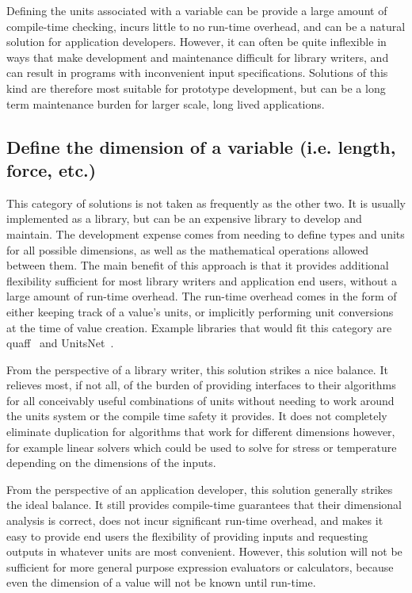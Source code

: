 \documentclass{article}
\begin{document}
Defining the units associated with a variable can be provide a large amount of compile-time checking,
incurs little to no run-time overhead, and can be a natural solution for application developers.
However, it can often be quite inflexible in ways that make development and maintenance difficult for library writers,
and can result in programs with inconvenient input specifications.
Solutions of this kind are therefore most suitable for prototype development,
but can be a long term maintenance burden for larger scale, long lived applications.

\subsection{Define the dimension of a variable (i.e. length, force, etc.)}
\label{static-dimensions}

This category of solutions is not taken as frequently as the other two.
It is usually implemented as a library, but can be an expensive library to develop and maintain.
The development expense comes from needing to define types and units for all possible dimensions,
as well as the mathematical operations allowed between them.
The main benefit of this approach is that it provides additional flexibility sufficient for most library writers
and application end users, without a large amount of run-time overhead.
The run-time overhead comes in the form of either keeping track of a value's units,
or implicitly performing unit conversions at the time of value creation.
Example libraries that would fit this category are quaff~\cite{QuaffFortranPackage} and UnitsNet~\cite{Larsen2021}.

From the perspective of a library writer, this solution strikes a nice balance.
It relieves most, if not all, of the burden of providing interfaces to their algorithms for all conceivably useful combinations of units without needing to work around the units system or the compile time safety it provides.
It does not completely eliminate duplication for algorithms that work for different dimensions however,
for example linear solvers which could be used to solve for stress or temperature depending on the dimensions of the inputs.

From the perspective of an application developer, this solution generally strikes the ideal balance.
It still provides compile-time guarantees that their dimensional analysis is correct,
does not incur significant run-time overhead,
and makes it easy to provide end users the flexibility of providing inputs and requesting outputs in whatever units are most convenient.
However, this solution will not be sufficient for more general purpose expression evaluators or calculators,
because even the dimension of a value will not be known until run-time.
\end{document}
